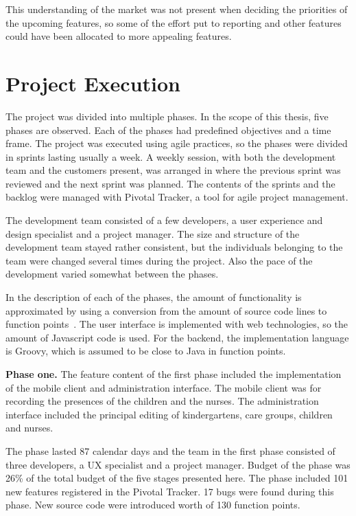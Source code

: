 This understanding of the market was not present when deciding the priorities of the upcoming features, so some of the effort put to reporting and other features could have been allocated to more appealing features.

 \section{Project Execution}

The project was divided into multiple phases. In the scope of this thesis, five phases are observed. Each of the phases had predefined objectives and a time frame. The project was executed using agile practices, so the phases were divided in sprints lasting usually a week. A weekly session, with both the development team and the customers present, was arranged in where the previous sprint was reviewed and the next sprint was planned. The contents of the sprints and the backlog were managed with Pivotal Tracker, a tool for agile project management.

The development team consisted of a few developers, a user experience and design specialist and a project manager. The size and structure of the development team stayed rather consistent, but the individuals belonging to the team were changed several times during the project. Also the pace of the development varied somewhat between the phases.

In the description of each of the phases, the amount of functionality is approximated by using a conversion from the amount of source code lines to function points~\cite{kloctofp}. The user interface is implemented with web technologies, so the amount of Javascript code is used. For the backend, the implementation language is Groovy, which is assumed to be close to Java in function points.

\textbf{Phase one.} The feature content of the first phase included the implementation of the mobile client and administration interface. The mobile client was for recording the presences of the children and the nurses. The administration interface included the principal editing of kindergartens, care groups, children and nurses.

The phase lasted 87 calendar days and the team in the first phase consisted of three developers, a UX specialist and a project manager. Budget of the phase was 26\% of the total budget of the five stages presented here. The phase included 101 new features registered in the Pivotal Tracker. 17 bugs were found during this phase. New source code were introduced worth of 130 function points.

